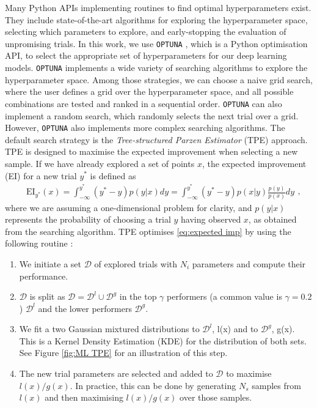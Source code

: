 Many Python APIs implementing routines to find optimal hyperparameters exist. They include state-of-the-art algorithms for exploring the hyperparameter space, selecting which parameters to explore, and early-stopping the evaluation of unpromising trials. In this work, we use \texttt{OPTUNA} \cite{optuna_2019}, which is a Python optimisation API, to select the appropriate set of hyperparameters for our deep learning models. \texttt{OPTUNA} implements a wide variety of searching algorithms to explore the hyperparameter space. Among those strategies, we can choose a naive grid search, where the user defines a grid over the hyperparameter space, and all possible combinations are tested and ranked in a sequential order. \texttt{OPTUNA} can also implement a random search, which randomly selects the next trial over a grid. However, \texttt{OPTUNA} also implements more complex searching algorithms. The default search strategy is the \emph{Tree-structured Parzen Estimator} (TPE) approach. TPE is designed to maximise the expected improvement when selecting a new sample. If we have already explored a set of points $x$, the expected improvement (EI) for a new trial $y^*$ is defined as
\begin{equation}\label{eq:expected imp}
    \begin{aligned}&\text{EI}_{y^*}(x)=\int_{-\infty}^{y^*}(y^*-y)p(y|x)dy=\int_{-\infty}^{y^*}(y^*-y)p(x|y)\frac{p(y)}{p(x)}dy\end{aligned},
\end{equation}
where we are assuming a one-dimensional problem for clarity, and $p(y|x)$ represents the probability of choosing a trial $y$ having observed $x$, as obtained from the searching algorithm. TPE optimises \cref{eq:expected imp} by using the following routine \cite{TPE}:
\begin{enumerate}
    \item We initiate a set $\mathcal{D}$ of explored trials with $N_i$ parameters and compute their performance.
    \item $\mathcal{D}$ is split as $\mathcal{D}=\mathcal{D}^l \cup \mathcal{D}^g$ in the top $\gamma$ performers (a common value is $\gamma=0.2$) $\mathcal{D}^l$ and the lower performers $\mathcal{D}^g$.
    \item We fit a two Gaussian mixtured distributions to $\mathcal{D}^l$, l(x) and to $\mathcal{D}^g$, g(x). This is a Kernel Density Estimation (KDE) for the distribution of both sets. See Figure \ref{fig:ML TPE} for an illustration of this step.
    \item The new trial parameters are selected and added to $\mathcal{D}$ to maximise $l(x)/g(x)$. In practice, this can be done by generating $N_s$ samples from $l(x)$ and then maximising $l(x)/g(x)$ over those samples.
\end{enumerate}

